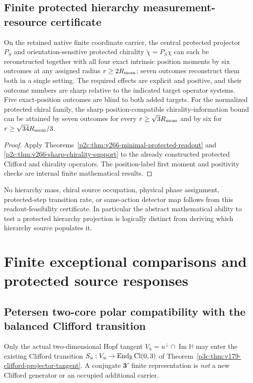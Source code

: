\documentclass[12pt,a4paper]{article}
\begin{document}
\subsection{Finite protected hierarchy measurement-resource certificate}
\label{p3c:sec:v266-protected-resource}
\begin{corollary}
\label{p3c:cor:v266-protected-projector-resource}
On the retained native finite coordinate carrier, the central protected
projector $P_S$ and orientation-sensitive protected chirality
$\widetilde\chi=P_S\chi$ can each be reconstructed together with all
four exact intrinsic position moments by six outcomes at any assigned
radius $r\ge2R_{\mathrm{mom}}$; seven outcomes reconstruct them both in a single
setting. The required effects are explicit and positive, and their
outcome numbers are sharp relative to the indicated target operator
systems. Five exact-position outcomes are blind to both added targets.
For the normalized protected chiral family, the sharp position-compatible
chirality-information bound can be attained by seven outcomes for every
$r\ge\sqrt3R_{\mathrm{mom}}$ and by six for
$r\ge\sqrt{34}R_{\mathrm{mom}}/3$.
\end{corollary}
\begin{proof}
Apply Theorems~\ref{p2c:thm:v266-minimal-protected-readout} and
\ref{p2c:thm:v266-sharp-chirality-support} to the already constructed
protected Clifford and chirality operators. The position-label first
moment and positivity checks are internal finite mathematical results.
\end{proof}
No hierarchy mass, chiral source occupation, physical phase assignment,
protected-step transition rate, or same-action detector map follows
from this readout-feasibility certificate. In particular the abstract
mathematical ability to test a protected hierarchy projection is
logically distinct from deriving which hierarchy source populates it.



\section{Finite exceptional comparisons and protected source responses}
\label{p3c:sec:v196-finite-comparisons}
\subsection{Petersen two-core polar compatibility with the balanced Clifford transition}
\label{p3c:sec:v319-petersen-protected}
Only the actual two-dimensional Hopf tangent
$V_u=u^\perp\cap\operatorname{Im}\mathbb H$ may enter the existing
Clifford transition $S_u:V_u\to\operatorname{End}_{\mathbb R}\operatorname{Cl}(0,3)$
of Theorem~\ref{p3c:thm:v179-clifford-projector-tangent}.  A
conjugate $\mathbf3'$ finite representation is \emph{not} a new
Clifford generator or an occupied additional carrier.
\end{document}
